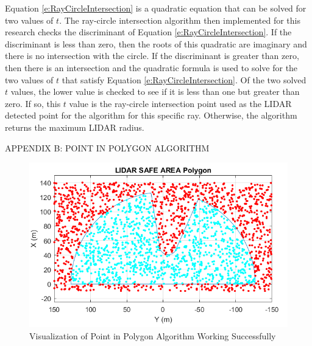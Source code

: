 \documentclass[12pt,onecolumn]{report}
\begin{document}
Equation \eqref{e:RayCircleIntersection} is a quadratic equation that can be solved for two values of $t$. The ray-circle intersection algorithm then implemented for this research checks the discriminant of Equation \eqref{e:RayCircleIntersection}. If the discriminant is less than zero, then the roots of this quadratic are imaginary and there is no intersection with the circle. If the discriminant is greater than zero, then there is an intersection and the quadratic formula is used to solve for the two values of $t$ that satisfy Equation \eqref{e:RayCircleIntersection}. Of the two solved $t$ values, the lower value is checked to see if it is less than one but greater than zero. If so, this $t$ value is the ray-circle intersection point used as the LIDAR detected point for the algorithm for this specific ray. Otherwise, the algorithm returns the maximum LIDAR radius. 

\newpage
\setcounter{chapter}{9}
\begin{noindent}
APPENDIX B: POINT IN POLYGON ALGORITHM
\end{noindent}

\begin{figure}[H]
	\centering
	\includegraphics[width=0.7\columnwidth]{Figs/PointInPolygon.png}
	\caption{\small Visualization of Point in Polygon Algorithm Working Successfully}  
	\label{fig:PointInPolygon}
\end{figure}
\end{document}
